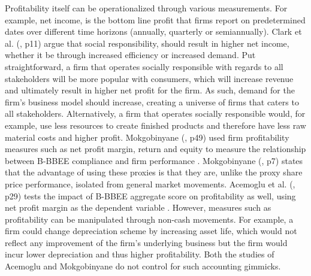 Profitability itself can be operationalized through various measurements. For example, net income, is the bottom line profit that firms report on predetermined dates over different time horizons (annually, quarterly or semiannually). Clark et al. (\citeyear{N16}, p11) argue that social responsibility, should result in higher net income, whether it be through increased efficiency or increased demand. Put straightforward, a firm that operates socially responsible with regards to all stakeholders will be more popular with consumers, which will increase revenue and ultimately result in higher net profit for the firm. As such, demand for the firm’s business model should increase, creating a universe of firms that caters to all stakeholders. Alternatively, a firm that operates socially responsible would, for example, use less  resources to create finished products and therefore have less raw material costs and higher profit. Mokgobinyane (\citeyear{N4}, p49) used firm profitability measures such as net profit margin, return and equity to measure the relationship between B-BBEE compliance and firm performance . Mokgobinyane (\citeyear{N4}, p7) states that the advantage of using these proxies is that they are, unlike the proxy share price performance, isolated from general market movements.  Acemoglu et al. (\citeyear{N23}, p29) tests the impact of B-BBEE aggregate score on profitability as well, using net profit margin as the dependent variable . However, measures such as profitability can be manipulated through non-cash movements. For example, a firm could change depreciation scheme by increasing asset life, which would not reflect any improvement of the firm’s underlying business but the firm would incur lower depreciation and thus higher profitability. Both the studies of Acemoglu and Mokgobinyane do not control for such accounting gimmicks.

